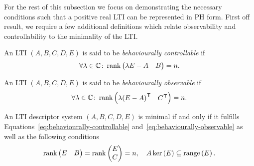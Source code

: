 For the rest of this subsection we focus on demonstrating the necessary conditions such that a positive real \ac{LTI} can be represented in \ac{PH} form.
First off result, we require a few additional definitions which relate observability and controllability to the minimality of the \ac{LTI}.

\begin{definition}\label{def:behaviourally-controllable}
    An \ac{LTI} $(A, B, C, D, E)$ is said to be \emph{behaviourally controllable} if
    \begin{equation}\label{eq:behaviourally-controllable}
        \forall \lambda  \in \mathbb{C} \colon \mathop{}\!\mathrm{rank}\left(\begin{matrix}
            \lambda E - A & B
        \end{matrix}\right) = n.
    \end{equation}
\end{definition}

\begin{definition}\label{def:behaviourally-observable}
    An \ac{LTI} $(A, B, C, D, E)$ is said to be \emph{behaviourally observable} if
    \begin{equation}\label{eq:behaviourally-observable}
        \forall \lambda  \in \mathbb{C} \colon \mathop{}\!\mathrm{rank}\left(\begin{matrix}
            \lambda {(E - A)}^{\mkern1mu \mathsf{T}} & C^{\mkern1mu \mathsf{T}}
        \end{matrix}\right) = n.
    \end{equation}
\end{definition}

\begin{lemma}\label{lem:minimality-conditions}
    An \ac{LTI} descriptor system $(A, B, C, D, E)$ is minimal if and only if it fulfills Equations~\eqref{eq:behaviourally-controllable} and~\eqref{eq:behaviourally-observable} as well as the following conditions
    \begin{equation*}
        \mathop{}\!\mathrm{rank}\left(\begin{matrix}
            E & B
        \end{matrix}\right) = \mathop{}\!\mathrm{rank}\left(\begin{matrix}
            E \\
            C
        \end{matrix}\right) = n,\quad A \mathop{}\!\mathrm{ker}\left(E\right) \subseteq \mathop{}\!\mathrm{range}\left(E\right).
    \end{equation*}
\end{lemma}


